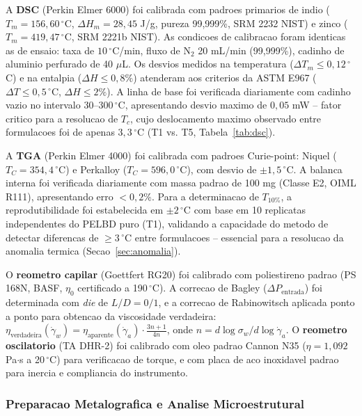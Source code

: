 \documentclass[11pt,a4paper,oneside]{article}
\begin{document}
A {\bfseries DSC} (Perkin Elmer 6000) foi calibrada com padroes primarios de indio
($T_m{=}156{,}60\,^{\circ}$C, $\Delta H_m{=}28{,}45$ J/g, pureza 99,999\%, SRM 2232 NIST) e
zinco ($T_m{=}419{,}47\,^{\circ}$C, SRM 2221b NIST). As condicoes de calibracao foram identicas
as de ensaio: taxa de $10\,^{\circ}$C/min, fluxo de N$_2$ 20 mL/min (99,999\%), cadinho de
aluminio perfurado de 40 $\mu$L. Os desvios medidos na temperatura ($\Delta T_m{\le}0{,}12\,^{\circ}$C)
e na entalpia ($\Delta H{\le}0{,}8\%$) atenderam aos criterios da ASTM E967 ($\Delta T{\le}0{,}5\,^{\circ}$C,
$\Delta H{\le}2\%$). A linha de base foi verificada diariamente com cadinho vazio no intervalo
30--300$\,^{\circ}$C, apresentando desvio maximo de $0{,}05$ mW -- fator critico para a
resolucao de $T_c$, cujo deslocamento maximo observado entre formulacoes foi de apenas
$3{,}3\,^{\circ}$C (T1 vs. T5, Tabela~\ref{tab:dsc}).

A {\bfseries TGA} (Perkin Elmer 4000) foi calibrada com padroes Curie-point: Niquel
($T_C{=}354{,}4\,^{\circ}$C) e Perkalloy ($T_C{=}596{,}0\,^{\circ}$C), com desvio de
$\pm1{,}5\,^{\circ}$C. A balanca interna foi verificada diariamente com massa padrao de 100 mg
(Classe E2, OIML R111), apresentando erro $<0{,}2\%$. Para a determinacao de $T_{10\%}$, a
reprodutibilidade foi estabelecida em $\pm2\,^{\circ}$C com base em 10 replicatas independentes
do PELBD puro (T1), validando a capacidade do metodo de detectar diferencas de ${\ge}3\,^{\circ}$C
entre formulacoes -- essencial para a resolucao da anomalia termica (Secao~\ref{sec:anomalia}).

O {\bfseries reometro capilar} (Goettfert RG20) foi calibrado com poliestireno padrao (PS 168N,
BASF, $\eta_0$ certificado a 190$\,^{\circ}$C). A correcao de Bagley ($\Delta P_{\text{entrada}}$)
foi determinada com \textit{die} de $L/D{=}0/1$, e a correcao de Rabinowitsch aplicada ponto a
ponto para obtencao da viscosidade verdadeira: $\eta_{\text{verdadeira}}(\dot{\gamma}_w){=}\eta_{\text{aparente}}(\dot{\gamma}_a){\cdot}\frac{3n+1}{4n}$, onde $n{=}d\log\sigma_w/d\log\dot{\gamma}_a$. O {\bfseries reometro oscilatorio} (TA DHR-2) foi calibrado com oleo padrao Cannon N35 ($\eta{=}1{,}092$ Pa$\cdot$s a 20$\,^{\circ}$C) para verificacao de torque, e com placa de aco inoxidavel padrao para inercia e compliancia do instrumento.

\subsubsection{Preparacao Metalografica e Analise Microestrutural}
\end{document}
